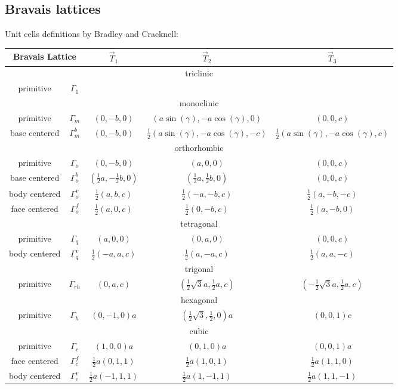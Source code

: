 \documentclass[final,12pt,makeidx,DIV=calc]{article}
\begin{document}
{{{\subsection{Bravais lattices}
Unit cells definitions by Bradley and Cracknell\cite{bradley72_book}:
\begin{center}
\begin{tabular}{|c|c|c|c|c|}
\hline
\multicolumn{2}{|c|}{Bravais Lattice} & $\vec{T}_1$& $\vec{T}_2$& $\vec{T}_3$\\
\hline
\hline
\multicolumn{5}{|c|}{triclinic}\\
\hline
primitive & $\Gamma_1$ & & &\\
\hline
%
\hline
\multicolumn{5}{|c|}{monoclinic}\\
\hline
primitive & $\Gamma_m$ & 
$(0,-b,0)$ & 
$(a\sin(\gamma),-a\cos(\gamma),0)$ 
&$(0,0,c)$ \\
base centered & $\Gamma_m^b$ & 
$(0,-b,0)$ & 
$\frac{1}{2}(a\sin(\gamma),-a\cos(\gamma),-c)$ &
$\frac{1}{2}(a\sin(\gamma),-a\cos(\gamma),c)$ \\
\hline
%
\hline
\hline
\multicolumn{5}{|c|}{orthorhombic}\\
\hline
primitive & $\Gamma_o$ & 
$(0,-b,0)$ & 
$(a,0,0)$ 
&$(0,0,c)$ \\
base centered & $\Gamma_o^b$ & 
$(\frac{1}{2}a,-\frac{1}{2}b,0)$ & 
$(\frac{1}{2}a,\frac{1}{2}b,0)$ & 
$(0,0,c)$ \\
body centered & $\Gamma_o^v$ & 
$\frac{1}{2}(a,b,c)$ & 
$\frac{1}{2}(-a,-b,c)$ & 
$\frac{1}{2}(a,-b,-c)$ \\
face centered & $\Gamma_o^f$ & 
$\frac{1}{2}(a,0,c)$ & 
$\frac{1}{2}(0,-b,c)$ & 
$\frac{1}{2}(a,-b,0)$ \\
\hline
%
\hline
\multicolumn{5}{|c|}{tetragonal}\\
\hline
primitive & $\Gamma_q$ & 
$(a,0,0)$ & 
$(0,a,0)$ 
&$(0,0,c)$ \\
\hline
body centered &$\Gamma_q^v$ & 
$\frac{1}{2}(-a,a,c)$ & 
$\frac{1}{2}(a,-a,c)$ & 
$\frac{1}{2}(a,a,-c)$ \\
\hline
%
\hline
\multicolumn{5}{|c|}{trigonal}\\
\hline
primitive & $\Gamma_{rh}$ & 
$(0,a,c)$ & 
$(\frac{1}{2}\sqrt{3}a,\frac{1}{2}a,c)$ &
$(-\frac{1}{2}\sqrt{3}a,\frac{1}{2}a,c)$ \\
\hline
%
\hline
\multicolumn{5}{|c|}{hexagonal}\\
\hline
primitive & $\Gamma_h$ & 
$(0,-1,0)a$ & 
$(\frac{1}{2}\sqrt{3},\frac{1}{2},0)a$ &
$(0,0,1)c$\\
\hline
%
\hline
\multicolumn{5}{|c|}{cubic}\\
\hline
primitive & $\Gamma_c$ & 
$(1,0,0)a$ & 
$(0,1,0)a$ & 
$(0,0,1)a$ \\
face centered & $\Gamma_c^f$ & 
$\frac{1}{2}a(0,1,1)$ & 
$\frac{1}{2}a(1,0,1)$ & 
$\frac{1}{2}a(1,1,0)$ \\
body centered & $\Gamma_c^v$ & 
$\frac{1}{2}a(-1,1,1)$ & 
$\frac{1}{2}a(1,-1,1)$ & 
$\frac{1}{2}a(1,1,-1)$ \\
\hline
\end{tabular}
\end{center}

}}}
\end{document}
